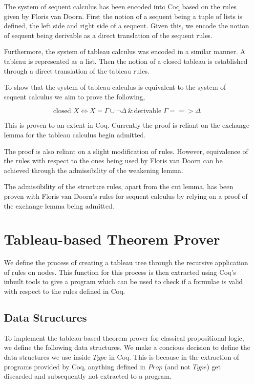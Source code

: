 \documentclass{article}
\begin{document}
The system of sequent calculus has been encoded into Coq based on the rules
given by Floris van Doorn. First the notion of a sequent being a tuple of lists
is defined, the left side and right side of a sequent. Given this, we encode
the notion of sequent being derivable as a direct translation of the sequent
rules.

Furthermore, the system of tableau calculus was encoded in a similar manner.
A tableau is represented as a list. Then the notion of a closed tableau is
established through a direct translation of the tableau rules.

To show that the system of tableau calculus is equivalent to the system of
sequent calculus we aim to prove the following,

\begin{equation}
\text{closed }X \iff X=\Gamma \cup \neg \Delta \, \& \, \text{derivable }
\Gamma ==> \Delta
\label{tableau sequent equivalence}
\end{equation}

This is proven to an extent in Coq. Currently the proof is reliant on the
exchange lemma for the tableau calculus begin admitted.

The proof is also reliant on a slight modification of rules. However,
equivalence of the rules with respect to the ones being used by Floris van
Doorn can be achieved through the admissibility of the weakening lemma.

The admissibility of the structure rules, apart from the cut lemma, has been
proven with Floris van Doorn's rules for sequent calculus by relying on a
proof of the exchange lemma being admitted.

\section{Tableau-based Theorem Prover}

We define the process of creating a tableau tree through the recursive
application of rules on nodes. This function for this process is then extracted
using Coq's inbuilt tools to give a program which can be used to check if a
formulae is valid with respect to the rules defined in Coq.

\subsection{Data Structures}

To implement the tableau-based theorem prover for classical propositional
logic, we define the following data structures. We make a concious decision to
define the data structures we use inside $Type$ in Coq. This is because in the
extraction of programs provided by Coq, anything defined in $Prop$ (and not
$Type$) get discarded and subsequently not extracted to a program.
\end{document}
